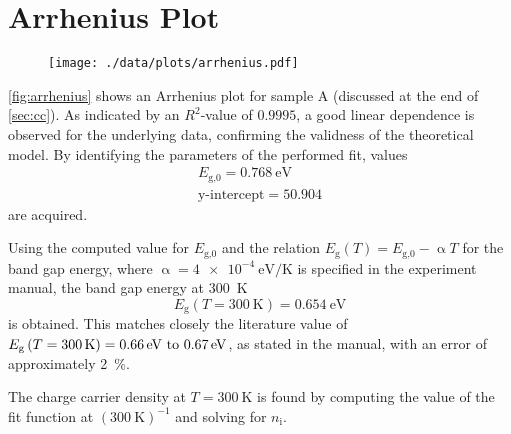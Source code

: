 
\section{Arrhenius Plot}\label{sec:arrhenius}
\begin{figure}
	\centering
	\texttt{[image: ./data/plots/arrhenius.pdf]}
	\label{fig:arrhenius}
\end{figure}

\autoref{fig:arrhenius} shows an Arrhenius plot for sample A (discussed at the end of \autoref{sec:cc}).
As indicated by an $R^2$-value of $0.9995$, a good linear dependence is observed for the underlying data, confirming the validness of the theoretical model.
By identifying the parameters of the performed fit, values
\begin{align*}
	E_\text{g,0} = \SI{0.768}{\eV} \\
	\text{y-intercept} = \num{50.904} %
\end{align*}
are acquired.

Using the computed value for $E_\text{g,0}$ and the relation $E_\text{g}(T) = E_\text{g,0} -\upalpha T$ for the band gap energy, where $\upalpha=\SI{4e-4}{\eV\per\kelvin}$ is specified in the experiment manual, the band gap energy at \SI{300}{\kelvin}
\begin{equation*}
	E_\text{g}\left(T = \SI{300}{\kelvin}\right) = \SI{0.654}{\eV}
\end{equation*}
is obtained.
This matches closely the literature value of $E_\text{g}\left(T = \SI{300}{\kelvin}\right) = \text{\SIrange{0.66}{0.67}{\eV}}$, as stated in the manual, with an error of approximately \SI{2}{\percent}.

The charge carrier density at $T = \SI{300}{\kelvin}$ is found by computing the value of the fit function at $\left(\SI{300}{\kelvin}\right)^{-1}$ and solving for $n_\text{i}$.


